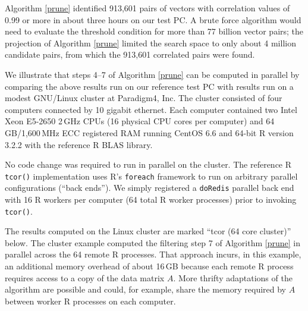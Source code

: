 \documentclass{article}
\let\proglang=\textsf
\numberwithin{algorithmctr}{section}
\begin{document}
Algorithm \ref{prune} identified 913,601 pairs of vectors with correlation
values of 0.99 or more in about three hours on our test PC. A brute force
algorithm would need to evaluate the threshold condition for more than 77
billion vector pairs; the projection of Algorithm \ref{prune} limited the
search space to only about 4 million candidate pairs, from which the 913,601
correlated pairs were found.

We illustrate that steps 4--7 of Algorithm \ref{prune} can be computed in
parallel by comparing the above results run on our reference test PC with
results run on a modest GNU/Linux cluster at Paradigm4, Inc. The cluster
consisted of four computers connected by 10 gigabit ethernet. Each computer
contained two Intel Xeon E5-2650 2$\,$GHz CPUs (16 physical CPU cores per
computer) and 64$\,$GB/1,600$\,$MHz ECC registered RAM running CentOS 6.6 and
64-bit \proglang{R} version 3.2.2 with the reference \proglang{R} BLAS library.

No code change was required to run in parallel on the cluster. The reference \proglang{R}
{\tt tcor()} implementation uses \proglang{R}'s {\tt foreach} \cite{foreach} framework to
run on arbitrary parallel configurations (``back ends''). We simply registered
a {\tt doRedis} \cite{doredis} parallel back end with 16 \proglang{R} workers per computer
(64 total \proglang{R} worker processes) prior to invoking {\tt tcor()}.

The results computed on the Linux cluster are marked ``tcor (64 core cluster)''
below. The cluster example computed the filtering step 7 of Algorithm
\ref{prune} in parallel across the 64 remote \proglang{R} processes. That approach incurs,
in this example, an additional memory overhead of about 16$\,$GB because each
remote \proglang{R} process requires access to a copy of the data matrix $A$. More thrifty
adaptations of the algorithm are possible and could, for example, share the
memory required by $A$ between worker \proglang{R} processes on each computer.
\end{document}
